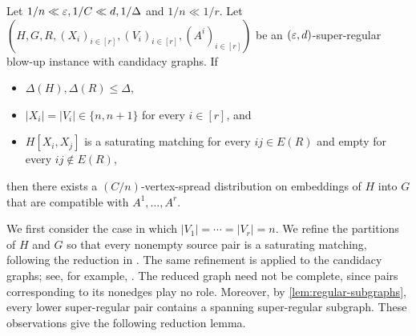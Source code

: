 \documentclass[11pt]{amsart}
\begin{document}
\begin{lemma}\label{lem:spread-blowup-auxiliary}
    Let $1 / n \ll \varepsilon, 1 / C \ll d, 1/\Delta$ and $1 / n \ll 1/r$.
    Let $(H, G, R, (X_i)_{i\in [r]}, (V_i)_{i\in [r]}, (A^i)_{i \in [r]})$ be an $(\varepsilon, d)$-super-regular blow-up instance with candidacy graphs.  If 
    \begin{itemize}
        \item $\Delta(H), \Delta(R) \leq \Delta$, 
        \item $|X_i| = |V_i| \in \{n, n+1\}$ for every $i \in [r]$, and 
        \item $H[X_i, X_j]$ is a saturating matching for every $ij \in E(R)$ and empty for every $ij \notin E(R)$, 
    \end{itemize}
    then there exists a $(C / n)$-vertex-spread distribution on embeddings of $H$ into $G$ that are compatible with $A^1, \dots, A^r$.
\end{lemma}

We first consider the case in which $|V_1|=\cdots=|V_r|=n$.  We refine the
partitions of $H$ and $G$ so that every nonempty source pair is a saturating
matching, following the reduction in \cite{RR99}.  The same refinement is
applied to the candidacy graphs; see, for example,
\cite[Lemma 5.2]{GJ20}.  The reduced graph need not be complete, since pairs
corresponding to its nonedges play no role.  Moreover, by
\cref{lem:regular-subgraphs}, every lower super-regular pair contains a
spanning super-regular subgraph.  These observations give the following
reduction lemma.
\end{document}
